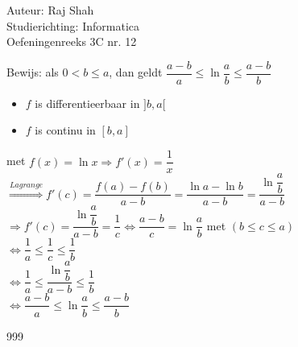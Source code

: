 \documentclass[a4paper]{article}
\begin{document}
  
\noindent \large Auteur: Raj Shah \\
\noindent \large Studierichting: Informatica\\
\noindent \large Oefeningenreeks 3C nr. 12 \\

\medskip

\normalsize

Bewijs: als $0 < b \leq a$, dan geldt $\dfrac{a-b}{a} \leq \ln \dfrac{a}{b} \leq \dfrac{a-b}{b}$\\

\begin{itemize}
	\item $f $ is differentieerbaar in $ ]b, a[$
	\item $f$ is continu in $[b, a]$
\end{itemize}

met $f(x) = \ln x \Rightarrow f'(x) = \dfrac{1}{x}$\\
$\overset{Lagrange}{\Rightarrow} f'(c) = \dfrac{f(a) - f(b)}{a-b} = \dfrac{\ln a - \ln b}{a-b} = \dfrac{\ln \dfrac{a}{b}}{a-b}$\\

$\Rightarrow f'(c) = \dfrac{\ln \dfrac{a}{b}}{a-b} = \dfrac{1}{c} \Leftrightarrow \dfrac{a-b}{c} = \ln \dfrac{a}{b}$ met $\left( b \leq c \leq a \right)$\\

$\Leftrightarrow \dfrac{1}{a} \leq \dfrac{1}{c} \leq \dfrac{1}{b}$\\

$\Leftrightarrow \dfrac{1}{a} \leq \dfrac{\ln \dfrac{a}{b}}{a-b} \leq \dfrac{1}{b}$\\

$\Leftrightarrow  \dfrac{a-b}{a} \leq \ln \dfrac{a}{b} \leq \dfrac{a-b}{b}$\\

\begin{thebibliography}{999}
\end{thebibliography}
\end{document}
